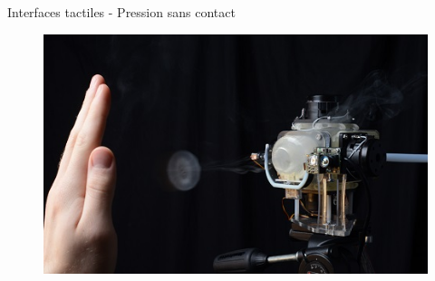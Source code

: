 {
\begin{frame}{Interfaces tactiles - Pression sans contact}
\begin{figure}
\href{run:videos/Aireal.mp4}{\includegraphics[width=\linewidth]{images/AIREALVortexRingFig}}
\end{figure}
\end{frame}
}

